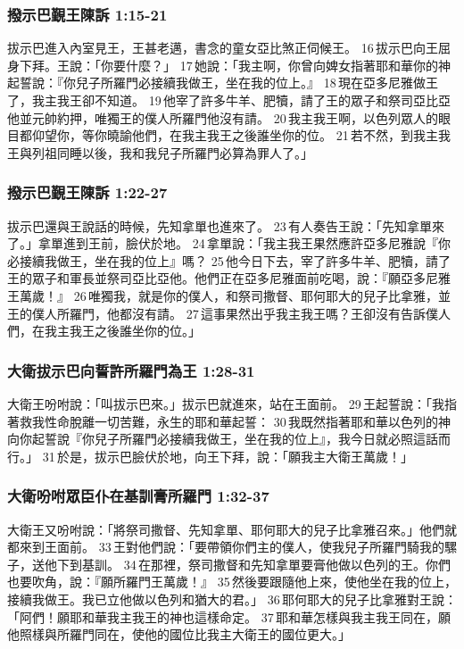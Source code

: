 \subsubsection{撥示巴覲王陳訴 1:15-21}
拔示巴進入內室見王，王甚老邁，書念的童女亞比煞正伺候王。 16 拔示巴向王屈身下拜。王說：「你要什麼？」 17 她說：「我主啊，你曾向婢女指著耶和華你的神起誓說：『你兒子所羅門必接續我做王，坐在我的位上。』 18 現在亞多尼雅做王了，我主我王卻不知道。 19 他宰了許多牛羊、肥犢，請了王的眾子和祭司亞比亞他並元帥約押，唯獨王的僕人所羅門他沒有請。 20 我主我王啊，以色列眾人的眼目都仰望你，等你曉諭他們，在我主我王之後誰坐你的位。 21 若不然，到我主我王與列祖同睡以後，我和我兒子所羅門必算為罪人了。」

\subsubsection{撥示巴覲王陳訴 1:22-27}
拔示巴還與王說話的時候，先知拿單也進來了。 23 有人奏告王說：「先知拿單來了。」拿單進到王前，臉伏於地。 24 拿單說：「我主我王果然應許亞多尼雅說『你必接續我做王，坐在我的位上』嗎？ 25 他今日下去，宰了許多牛羊、肥犢，請了王的眾子和軍長並祭司亞比亞他。他們正在亞多尼雅面前吃喝，說：『願亞多尼雅王萬歲！』 26 唯獨我，就是你的僕人，和祭司撒督、耶何耶大的兒子比拿雅，並王的僕人所羅門，他都沒有請。 27 這事果然出乎我主我王嗎？王卻沒有告訴僕人們，在我主我王之後誰坐你的位。」

\subsubsection{大衛拔示巴向誓許所羅門為王 1:28-31}
大衛王吩咐說：「叫拔示巴來。」拔示巴就進來，站在王面前。 29 王起誓說：「我指著救我性命脫離一切苦難，永生的耶和華起誓： 30 我既然指著耶和華以色列的神向你起誓說『你兒子所羅門必接續我做王，坐在我的位上』，我今日就必照這話而行。」 31 於是，拔示巴臉伏於地，向王下拜，說：「願我主大衛王萬歲！」

\subsubsection{大衛吩咐眾臣仆在基訓膏所羅門 1:32-37}
大衛王又吩咐說：「將祭司撒督、先知拿單、耶何耶大的兒子比拿雅召來。」他們就都來到王面前。 33 王對他們說：「要帶領你們主的僕人，使我兒子所羅門騎我的騾子，送他下到基訓。 34 在那裡，祭司撒督和先知拿單要膏他做以色列的王。你們也要吹角，說：『願所羅門王萬歲！』 35 然後要跟隨他上來，使他坐在我的位上，接續我做王。我已立他做以色列和猶大的君。」 36 耶何耶大的兒子比拿雅對王說：「阿們！願耶和華我主我王的神也這樣命定。 37 耶和華怎樣與我主我王同在，願他照樣與所羅門同在，使他的國位比我主大衛王的國位更大。」

